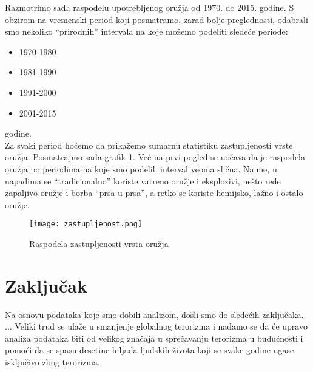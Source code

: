 \documentclass[a4paper]{article}
\begin{document}
Razmotrimo sada raspodelu upotrebljenog oružja od 1970. do 2015. godine. S obzirom na vremenski period koji posmatramo, zarad bolje preglednosti, odabrali smo nekoliko ``prirodnih'' intervala na koje možemo podeliti sledeće periode: 
\begin{itemize}
	\item 1970-1980
	\item 1981-1990
	\item 1991-2000
	\item 2001-2015\\ 
\end{itemize} 
godine.\\
Za svaki period hoćemo da prikažemo sumarnu statistiku zastupljenosti vrste oružja. Posmatrajmo sada grafik \ref{fig:oruzja}. Već na prvi pogled se uočava da je raspodela oružja po periodima na koje smo podelili interval veoma slična. Naime, u napadima se ``tradicionalno'' koriste vatreno oružje i eksplozivi, nešto ređe zapaljivo oružje i borba ``prsa u prsa'', a retko se koriste hemijsko, lažno i ostalo oružje.

\begin{figure}[h!]
\centering
\texttt{[image: zastupljenost.png]}
\caption{Raspodela zastupljenosti vrsta oružja}
\label{fig:oruzja}
\end{figure} 

\newpage
\section{Zaključak}
\label{sec:zakljucak}
Na osnovu podataka koje smo dobili analizom, došli smo do sledećih zaključaka.
...
Veliki trud se ulaže u smanjenje globalnog terorizma i nadamo se da će upravo analiza podataka biti od velikog značaja u sprečavanju terorizma u budućnosti i pomoći da se spasu desetine hiljada ljudskih života koji se svake godine ugase isključivo zbog terorizma.

\appendix
 

\end{document}
